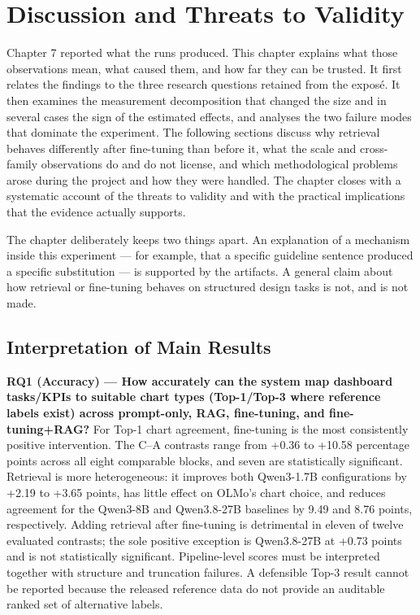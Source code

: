 \chapter{Discussion and Threats to Validity}

Chapter 7 reported what the runs produced. This chapter explains what those observations mean, what caused them, and how far they can be trusted. It first relates the findings to the three research questions retained from the expos\'e. It then examines the measurement decomposition that changed the size and in several cases the sign of the estimated effects, and analyses the two failure modes that dominate the experiment. The following sections discuss why retrieval behaves differently after fine-tuning than before it, what the scale and cross-family observations do and do not license, and which methodological problems arose during the project and how they were handled. The chapter closes with a systematic account of the threats to validity and with the practical implications that the evidence actually supports.

The chapter deliberately keeps two things apart. An explanation of a mechanism inside this experiment --- for example, that a specific guideline sentence produced a specific substitution --- is supported by the artifacts. A general claim about how retrieval or fine-tuning behaves on structured design tasks is not, and is not made.

\section{Interpretation of Main Results}

\textbf{RQ1 (Accuracy) --- How accurately can the system map dashboard tasks/KPIs to suitable chart types (Top-1/Top-3 where reference labels exist) across prompt-only, RAG, fine-tuning, and fine-tuning+RAG?} For Top-1 chart agreement, fine-tuning is the most consistently positive intervention. The C--A contrasts range from +0.36 to +10.58 percentage points across all eight comparable blocks, and seven are statistically significant. Retrieval is more heterogeneous: it improves both Qwen3-1.7B configurations by +2.19 to +3.65 points, has little effect on OLMo's chart choice, and reduces agreement for the Qwen3-8B and Qwen3.8-27B baselines by 9.49 and 8.76 points, respectively. Adding retrieval after fine-tuning is detrimental in eleven of twelve evaluated contrasts; the sole positive exception is Qwen3.8-27B at +0.73 points and is not statistically significant. Pipeline-level scores must be interpreted together with structure and truncation failures. A defensible Top-3 result cannot be reported because the released reference data do not provide an auditable ranked set of alternative labels.

